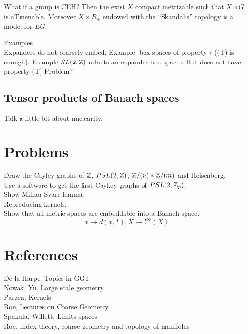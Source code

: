 What if a group is CEH? Then the exist $X$ compact metrizable such that $X\rtimes G$ is aTmenable. Moreover $X\times R_+$ endowed with the ``Skandalis'' topology is a model for $\underline E G $.

Examples\\

Expanders do not coarsely embed. Example: box spaces of property $\tau$ ((T) is enough). Example $SL(2,\mathbb Z)$ admits an expander box spaces. But does not have property (T) Problem?\\

\subsection{Tensor products of Banach spaces}

Talk a little bit about nuclearity.

\section{Problems}

Draw the Cayley graphs of $\mathbb Z$, $PSL(2,\mathbb Z)$, $\mathbb Z / (n) \ast \mathbb Z / (m)$ and Heisenberg.\\

Use a software to get the first Caykey graphs of $PSL(2,\mathbb Z_p)$.\\

Show Milnor Svarc lemma.\\

Reproducing kernels.\\

Show that all metric spaces are embeddable into a Banach space. 
\[x\mapsto d(x, *), X\rightarrow l^\infty (X)\]

\section{References}

De la Harpe, Topics in GGT\\
Nowak, Yu, Large scale geometry\\
Parzen, Kernels\\
Roe, Lectures on Coarse Geometry\\
Spakula, Willett, Limits spaces\\
Roe, Index theory, coarse geometry and topology of manifolds\\
